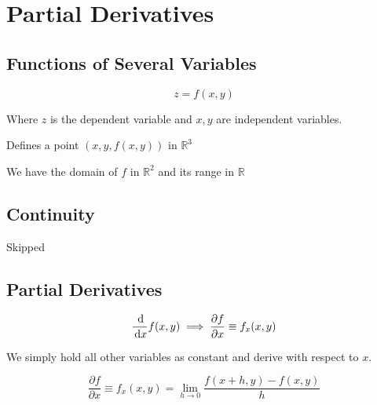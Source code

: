 \chapter{Partial Derivatives}

\section{Functions of Several Variables}

\begin{definition}
	\begin{equation}
		z = f(x, y)
	\end{equation}

	Where $z$ is the dependent variable and $x, y$ are independent variables.

	Defines a point $(x, y, f(x, y))$ in $\mathbb{R}^3$

	We have the domain of $f$ in $\mathbb{R}^2$ and its range in $\mathbb{R}$
\end{definition}

\section{Continuity}

Skipped

\section{Partial Derivatives}

\begin{equation}
	\frac{\D}{\D x} f(x, y) \implies \frac{\partial f}{\partial x} \equiv f_x(x, y)
\end{equation}

We simply hold all other variables as constant and derive with respect to $x$.

\begin{definition}
	\begin{equation}
		\frac{\partial f}{\partial x} \equiv f_x(x, y) = \lim_{h \to 0} \frac{f(x+h, y) - f(x, y)}{h}
	\end{equation}
\end{definition}